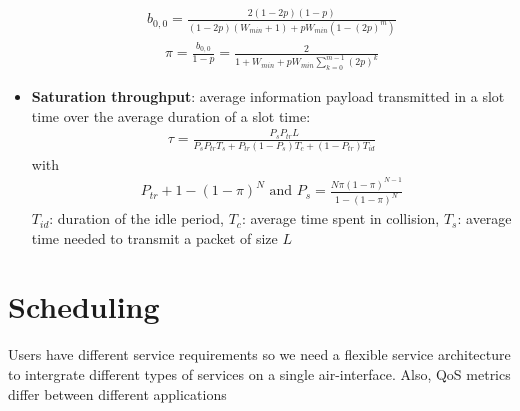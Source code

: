 \begin{itemize}
\begin{align*}
		b_{0,0} = \frac{2 (1 - 2p)(1 - p)}{(1 - 2p)(W_{min} + 1) + pW_{min}(1 - (2p)^m)}
	\end{align*}
	\begin{align*}
		\pi = \frac{b_{0,0}}{1 - p} = \frac{2}{1 + W_{min} + p W_{min} \sum_{k=0}^{m-1} (2p)^k}
	\end{align*}
	\item \textbf{Saturation throughput}: average information payload transmitted in a slot time over the average duration of a slot time:
	\begin{align*}
	\tau = \frac{P_s P_{tr} L}{P_s P_{tr} T_s + P_{tr} (1 - P_s) T_c + (1 - P_{tr}) T_{id}}
	\end{align*}
	with 
	\begin{align*}
		P_{tr} + 1 - (1-\pi)^N \text{ and } P_s = \frac{N \pi (1 - \pi)^{N-1}}{1 - (1 - \pi)^N}
	\end{align*}
	$T_{id}$: duration of the idle period, $T_c$: average time spent in collision, $T_s$: average time needed to transmit a packet of size $L$
\end{itemize}
\section{Scheduling}
\begin{notImportant}
	Users have different service requirements so we need a flexible service architecture to intergrate different types of services on a single air-interface. Also, QoS metrics differ between different applications
\end{notImportant}

